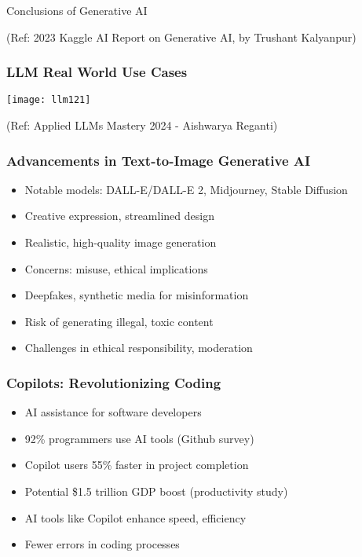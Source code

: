 \begin{frame}[fragile]\frametitle{}
\begin{center}
{\Large Conclusions of Generative AI}
\end{center}

{\tiny (Ref: 2023 Kaggle AI Report on Generative AI, by Trushant Kalyanpur)}

\end{frame}

\begin{frame}[fragile]\frametitle{LLM Real World Use Cases}

\begin{center}
\texttt{[image: llm121]}
\end{center}				

{\tiny (Ref: Applied LLMs Mastery 2024 - Aishwarya Reganti)}

\end{frame}


\begin{frame}[fragile]\frametitle{Advancements in Text-to-Image Generative AI}
    \begin{itemize}
        \item Notable models: DALL-E/DALL-E 2, Midjourney, Stable Diffusion
        \item Creative expression, streamlined design
        \item Realistic, high-quality image generation
        \item Concerns: misuse, ethical implications
        \item Deepfakes, synthetic media for misinformation
        \item Risk of generating illegal, toxic content
        \item Challenges in ethical responsibility, moderation
    \end{itemize}
\end{frame}

\begin{frame}[fragile]\frametitle{Copilots: Revolutionizing Coding}
    \begin{itemize}
        \item AI assistance for software developers
        \item 92\% programmers use AI tools (Github survey)
        \item Copilot users 55\% faster in project completion
        \item Potential \$1.5 trillion GDP boost (productivity study)
        \item AI tools like Copilot enhance speed, efficiency
        \item Fewer errors in coding processes
    \end{itemize}
\end{frame}


